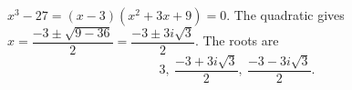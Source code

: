 $x^3-27=(x-3)(x^2+3x+9)=0$. The quadratic gives $x=\dfrac{-3\pm\sqrt{9-36}}{2}=\dfrac{-3\pm3i\sqrt3}{2}$. The roots are
\[
\boxed{3,\ \dfrac{-3+3i\sqrt3}{2},\ \dfrac{-3-3i\sqrt3}{2}}.
\]
